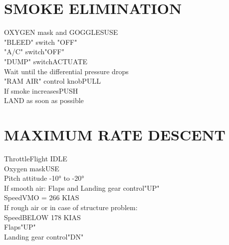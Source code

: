 \documentclass{article}
\begin{document}
\begin{multicols*}{2}
\section*{SMOKE ELIMINATION}
OXYGEN mask and GOGGLES\dotfill USE\\
"BLEED" switch "OFF"\\
"A/C" switch\dotfill "OFF"\\
"DUMP" switch\dotfill ACTUATE\\
Wait until the differential pressure drops\\
"RAM AIR" control knob\dotfill PULL\\
If smoke increases\dotfill PUSH\\
LAND as soon as possible
\section*{MAXIMUM RATE DESCENT}
Throttle\dotfill Flight IDLE\\
Oxygen mask\dotfill USE\\
Pitch attitude -10° to -20°\\
If smooth air:
Flaps and Landing gear control\dotfill "UP"\\
Speed\dotfill VMO = 266 KIAS\\
If rough air or in case of structure problem:\\
Speed\dotfill BELOW 178 KIAS\\
Flaps\dotfill "UP"\\
Landing gear control\dotfill "DN"

\end{multicols*}
\end{document}
